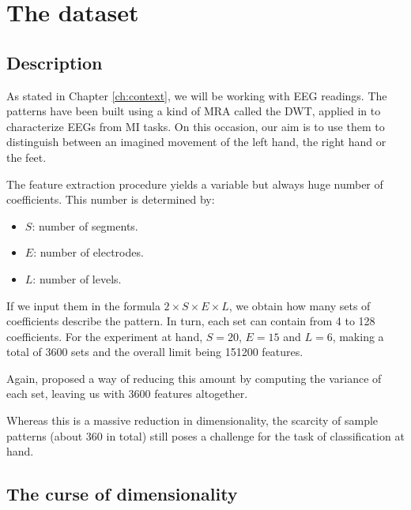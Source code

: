 \chapter{The dataset}\label{ch:dataset}

\section{Description}

	As stated in Chapter \ref{ch:context}, we will be working with \acs{EEG} readings. The patterns have been built using a kind of \ac{MRA} \cite{daubechies1992ten} called the \ac{DWT}, applied in \cite{asensio2013multiresolution} to characterize \acs{EEG}s from \ac{MI} tasks. On this occasion, our aim is to use them to distinguish between an imagined movement of the left hand, the right hand or the feet.

	The feature extraction procedure yields a variable but always huge number of coefficients. This number is determined by:

	\begin{itemize}

		\item
		$S$: number of segments.

		\item
		$E$: number of electrodes.

		\item
		$L$: number of levels.

	\end{itemize}

	If we input them in the formula $2 \times S \times E \times L$, we obtain how many sets of coefficients describe the pattern. In turn, each set can contain from 4 to 128 coefficients. For the experiment at hand, $S = 20$, $E = 15$ and $L = 6$, making a total of 3600 sets and the overall limit being 151200 features.

	Again, \cite{asensio2013multiresolution} proposed a way of reducing this amount by computing the variance of each set, leaving us with 3600 features altogether.

	Whereas this is a massive reduction in dimensionality, the scarcity of sample patterns (about 360 in total) still poses a challenge for the task of classification at hand.

\section{The curse of dimensionality} 

